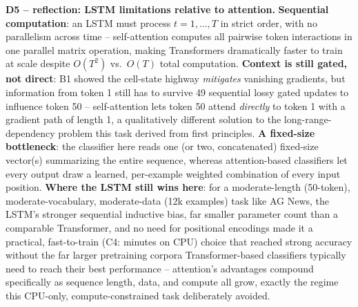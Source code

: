 \documentclass[11pt,a4paper]{article}
\begin{document}
\textbf{D5 -- reflection: LSTM limitations relative to attention.} \textbf{Sequential
computation}: an LSTM must process $t{=}1,\ldots,T$ in strict order, with no parallelism
across time -- self-attention computes all pairwise token interactions in one parallel
matrix operation, making Transformers dramatically faster to train at scale despite $O(T^2)$
vs.\ $O(T)$ total computation. \textbf{Context is still gated, not direct}: B1 showed the
cell-state highway \emph{mitigates} vanishing gradients, but information from token 1 still
has to survive 49 sequential lossy gated updates to influence token 50 -- self-attention lets
token 50 attend \emph{directly} to token 1 with a gradient path of length 1, a qualitatively
different solution to the long-range-dependency problem this task derived from first
principles. \textbf{A fixed-size bottleneck}: the classifier here reads one (or two,
concatenated) fixed-size vector(s) summarizing the entire sequence, whereas attention-based
classifiers let every output draw a learned, per-example weighted combination of every input
position. \textbf{Where the LSTM still wins here}: for a moderate-length (50-token),
moderate-vocabulary, moderate-data (12k examples) task like AG News, the LSTM's stronger
sequential inductive bias, far smaller parameter count than a comparable Transformer, and no
need for positional encodings made it a practical, fast-to-train (C4: minutes on CPU) choice
that reached strong accuracy without the far larger pretraining corpora Transformer-based
classifiers typically need to reach their best performance -- attention's advantages compound
specifically as sequence length, data, and compute all grow, exactly the regime this
CPU-only, compute-constrained task deliberately avoided.
\end{document}
